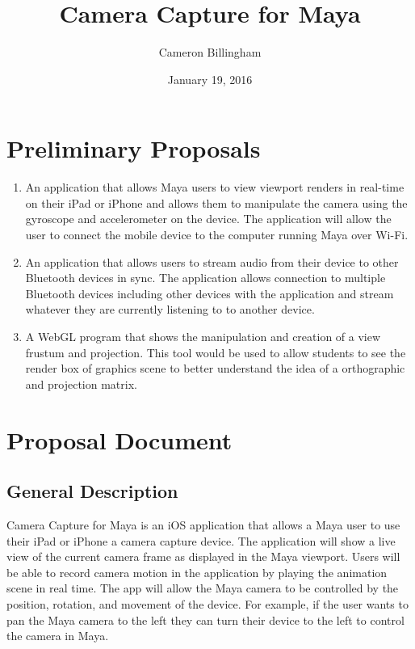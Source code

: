 \documentclass[11pt]{article}
\title{Camera Capture for Maya}
\author{Cameron Billingham}
\date{January 19, 2016}
\numberwithin{page}{section}%
\begin{document}
\maketitle
\thispagestyle{empty}
\pagebreak

\tableofcontents
\thispagestyle{empty}
\pagebreak

\section{Preliminary Proposals}

\begin{enumerate}
\item
An application that allows Maya users to view viewport renders in real-time on their iPad or iPhone and allows them to manipulate the camera using the gyroscope and accelerometer on the device. The application will allow the user to connect the mobile device to the computer running Maya over Wi-Fi.
\item
An application that allows users to stream audio from their device to other Bluetooth devices in sync. The application allows connection to multiple Bluetooth devices including other devices with the application and stream whatever they are currently listening to to another device.
\item
A WebGL program that shows the manipulation and creation of a view frustum and projection. This tool would be used to allow students to see the render box of graphics scene to better understand the idea of a orthographic and projection matrix.
\end{enumerate}

\clearpage

\section{Proposal Document}
\subsection{General Description}
Camera Capture for Maya is an iOS application that allows a Maya user to use their iPad or iPhone a camera capture device. The application will show a live view of the current camera frame as displayed in the Maya viewport. Users will be able to record camera motion in the application by playing the animation scene in real time. The app will allow the Maya camera to be controlled by the position, rotation, and movement of the device. For example, if the user wants to pan the Maya camera to the left they can turn their device to the left to control the camera in Maya. 
\end{document}
